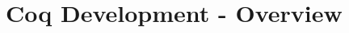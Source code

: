 \documentclass[preprint]{sigplanconf}
\newcommand{\FOR}{{\tt for} \ }
\newcommand{\WHERE}{{\tt where} \ }
\newcommand{\IN}{ \ {\tt in} \ }
\newcommand{\RETURN}{{\tt return} \ }
\begin{document}
%
%
\section{Coq Development - Overview}
\end{document}
